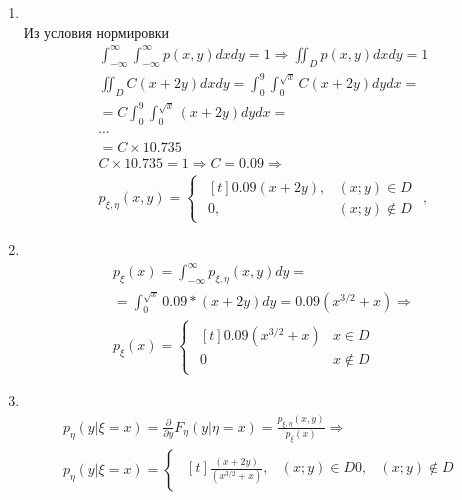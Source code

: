 \documentclass[12pt]{article}
\begin{document}
\begin{enumerate}
	\item \mbox{}\\
	      Из условия нормировки
	      \begin{gather*}
		      \int_{-\infty}^{\infty}\int_{-\infty}^{\infty}p(x,y)dxdy = 1 \Rightarrow \iint_{D}p(x,y)dxdy = 1 \\
		      \iint_{D}C(x + 2y)dxdy = \int_0^9\int_0^{\sqrt{x}}C(x + 2y)dydx = \\
		      = C\int_0^9\int_0^{\sqrt{x}}(x + 2y)dydx = \\
		      \cdots \\
		      = C \times 10.735 \\
		      C \times 10.735 = 1 \Rightarrow C = 0.09 \Rightarrow \\
		      p_{\xi,\eta}(x,y) =
		      \begin{cases}
			      \begin{aligned}[t]
				      0.09(x + 2y), & (x;y) \in D    \\
				      0,            & (x;y) \notin D
			      \end{aligned}
		      \end{cases},
	      \end{gather*}

	\item \mbox{}\\
	      \begin{gather*}
		      p_{\xi}(x) = \int_{-\infty}^{\infty}p_{\xi,\eta}(x,y)dy = \\
		      = \int_{0}^{\sqrt{x}}0.09 * (x + 2y)dy = 0.09(x^{3/2} + x) \Rightarrow \\
		      p_{\xi}(x) =
		      \begin{cases}
			      \begin{aligned}[t]
				      0.09(x^{3/2} + x) & x \in D    \\
				      0                 & x \notin D
			      \end{aligned}
		      \end{cases}
	      \end{gather*}

	\item \mbox{}\\
	      \begin{gather*}
		      p_{\eta}(y|\xi = x) = \frac{\partial}{\partial y}F_{\eta}(y|\eta = x)
		      = \frac{p_{\xi, \eta}(x, y)}{p_{\xi}(x)} \Rightarrow \\
		      p_{\eta}(y|\xi = x) =
		      \begin{cases}
			      \begin{aligned}[t]
				      \frac{(x + 2y)}{(x^{3/2} + x)}, & (x;y) \in D
				      0,                              & (x;y) \notin D
			      \end{aligned}
		      \end{cases}
	      \end{gather*}


\end{enumerate}
\end{document}
